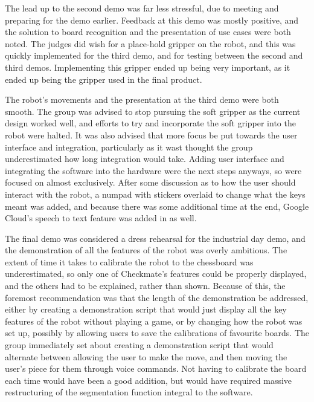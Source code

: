 \documentclass[onecolumn]{IEEEtran}
\begin{document}
The lead up to the second demo was far less stressful, due to meeting and preparing for the demo earlier. Feedback at this demo was mostly positive, and the solution to board recognition and the presentation of use cases were both noted. The judges did wish for a place-hold gripper on the robot, and this was quickly implemented for the third demo, and for testing between the second and third demos. Implementing this gripper ended up being very important, as it ended up being the gripper used in the final product. \par
The robot's movements and the presentation at the third demo were both smooth. The group was advised to stop pursuing the soft gripper as the current design worked well, and efforts to try and incorporate the soft gripper into the robot were halted. It was also advised that more focus be put towards the user interface and integration, particularly as it wast thought the group underestimated how long integration would take. Adding user interface and integrating the software into the hardware were the next steps anyways, so were focused on almost exclusively. After some discussion as to how the user should interact with the robot, a numpad with stickers overlaid to change what the keys meant was added, and because there was some additional time at the end, Google Cloud's speech to text feature was added in as well.\par
The final demo was considered a dress rehearsal for the industrial day demo, and the demonstration of all the features of the robot was overly ambitious. The extent of time it takes to calibrate the robot to the chessboard was underestimated, so only one of Checkmate's features could be properly displayed, and the others had to be explained, rather than shown. Because of this, the foremost recommendation was that the length of the demonstration be addressed, either by creating a demonstration script that would just display all the key features of the robot without playing a game, or by changing how the robot was set up, possibly by allowing users to save the calibrations of favourite boards. The group immediately set about creating a demonstration script that would alternate between allowing the user to make the move, and then moving the user's piece for them through voice commands. Not having to calibrate the board each time would have been a good addition, but would have required massive restructuring of the segmentation function integral to the software.\par
\end{document}
